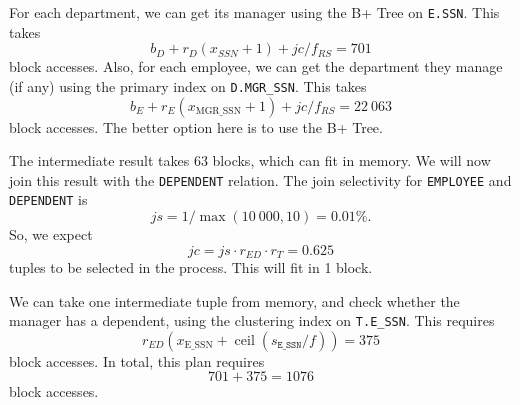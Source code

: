 \documentclass[a4paper, openany]{memoir}
\theoremstyle{definition}
\begin{document}
\begin{answer}
\begin{enumerate}
        For each department, we can get its manager using the B+ Tree on \texttt{E.SSN}. This takes
        \[b_D + r_D(x_{SSN} + 1) + \textit{jc}/f_{RS} = 701\]
        block accesses. Also, for each employee, we can get the department they manage (if any) using the primary index on \texttt{D.MGR\_SSN}. This takes
        \[b_E + r_E(x_{\text{MGR\_SSN}} + 1) + \textit{jc}/f_{RS} = 22 \ 063\]
        block accesses. The better option here is to use the B+ Tree. 
        
        The intermediate result takes 63 blocks, which can fit in memory. We will now join this result with the \texttt{DEPENDENT} relation. The join selectivity for \texttt{EMPLOYEE} and \texttt{DEPENDENT} is
        \[\textit{js} = 1/\max(10 \ 000, 10) = 0.01\%.\]
        So, we expect
        \[\textit{jc} = \textit{js} \cdot r_{ED} \cdot r_T = 0.625\]
        tuples to be selected in the process. This will fit in 1 block.
        
        We can take one intermediate tuple from memory, and check whether the manager has a dependent, using the clustering index on \texttt{T.E\_SSN}. This requires
        \[r_{ED} (x_{\text{E\_SSN}} + \operatorname{ceil}(s_{\texttt{E\_SSN}}/f)) = 375\]
        block accesses. In total, this plan requires
        \[701 + 375 = 1076\]
        block accesses.
    \end{enumerate}
\end{answer}
\newpage
\end{document}
